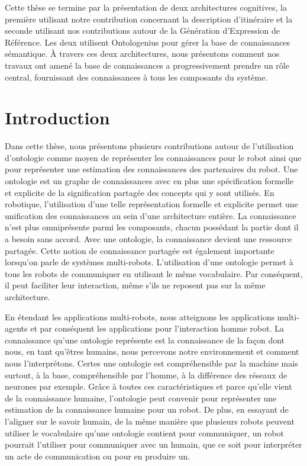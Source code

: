 Cette thèse se termine par la présentation de deux architectures cognitives, la première utilisant notre contribution concernant la description d’itinéraire et la seconde utilisant nos contributions autour de la Génération d’Expression de Référence. Les deux utilisent Ontologenius pour gérer la base de connaissances sémantique. À travers ces deux architectures, nous présentons comment nos travaux ont amené la base de connaissances a progressivement prendre un rôle central, fournissant des connaissances à tous les composants du système. 

\section*{Introduction}

Dans cette thèse, nous présentons plusieurs contributions autour de l'utilisation d'ontologie comme moyen de représenter les connaissances pour le robot ainsi que pour représenter une estimation des connaissances des partenaires du robot. Une ontologie est un graphe de connaissances avec en plus une spécification formelle et explicite de la signification partagée des concepts qui y sont utilisés. En robotique, l'utilisation d'une telle représentation formelle et explicite permet une unification des connaissances au sein d'une architecture entière. La connaissance n'est plus omniprésente parmi les composants, chacun possédant la partie dont il a besoin sans accord. Avec une ontologie, la connaissance devient une ressource partagée. Cette notion de connaissance partagée est également importante lorsqu'on parle de systèmes multi-robots. L'utilisation d'une ontologie permet à tous les robots de communiquer en utilisant le même vocabulaire. Par conséquent, il peut faciliter leur interaction, même s'ils ne reposent pas sur la même architecture.

En étendant les applications multi-robots, nous atteignons les applications multi-agents et par conséquent les applications pour l'interaction homme robot. La connaissance qu'une ontologie représente est la connaissance de la façon dont nous, en tant qu'êtres humains, nous percevons notre environnement et comment nous l'interprétons. Certes une ontologie est compréhensible par la machine mais surtout, à la base, compréhensible par l'homme, à la différence des réseaux de neurones par exemple. Grâce à toutes ces caractéristiques et parce qu'elle vient de la connaissance humaine, l'ontologie peut convenir pour représenter une estimation de la connaissance humaine pour un robot. De plus, en essayant de l'aligner sur le savoir humain, de la même manière que plusieurs robots peuvent utiliser le vocabulaire qu'une ontologie contient pour communiquer, un robot pourrait l'utiliser pour communiquer avec un humain, que ce soit pour interpréter un acte de communication ou pour en produire un. 

